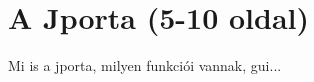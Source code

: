 \chapter{A Jporta (5-10 oldal)}\label{chapter:jporta}

Mi is a jporta, milyen funkciói vannak, gui...